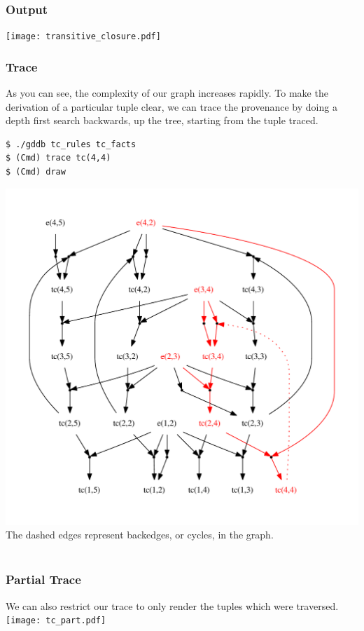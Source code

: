 \documentclass[12pt]{report}
\begin{document}
\subsubsection*{Output}
\texttt{[image: transitive\_closure.pdf]} \\
\subsubsection*{Trace}
As you can see, the complexity of our graph increases rapidly. To make the derivation of a particular tuple clear, we can trace the provenance by doing a depth first search backwards, up the tree, starting from the tuple traced.
\begin{verbatim}
$ ./gddb tc_rules tc_facts
$ (Cmd) trace tc(4,4)
$ (Cmd) draw
\end{verbatim}
\includegraphics[scale=0.5]{tc_trace_full.pdf} \\
The dashed edges represent backedges, or cycles, in the graph. \\
\bigskip \\
\subsubsection*{Partial Trace}
We can also restrict our trace to only render the tuples which were traversed.
\texttt{[image: tc\_part.pdf]} \\
\end{document}
